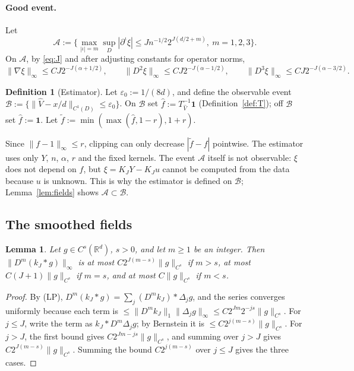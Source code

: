 \documentclass[11pt]{article}
\newtheorem{lemma}[theorem]{Lemma}
\theoremstyle{definition}
\newtheorem{definition}[theorem]{Definition}
\theoremstyle{remark}
\newcommand{\R}{\mathbb R}
\newcommand{\one}{\mathbf 1}
\newcommand{\cA}{\mathcal A}
\newcommand{\cB}{\mathcal B}
\begin{document}
\paragraph{Good event.} Let
\[
\cA:=\Big\{\max_{|\iota|=m}\sup_D|\partial^\iota\xi|\le Jn^{-1/2}2^{J(d/2+m)},\ m=1,2,3\Big\}.
\]
On $\cA$, by \eqref{eq:J} and after adjusting constants for operator norms,
\begin{equation}\label{eq:xi}
\|\nabla\xi\|_\infty\le CJ2^{-J(\alpha+1/2)},\qquad\|D^2\xi\|_\infty\le CJ2^{-J(\alpha-1/2)},\qquad\|D^3\xi\|_\infty\le CJ2^{-J(\alpha-3/2)} .
\end{equation}

\begin{definition}[Estimator]\label{def:est}
Let $\varepsilon_0:=1/(8d)$, and define the observable event $\cB:=\{\|\hat V-x/d\|_{C^1(D)}\le\varepsilon_0\}$. On $\cB$ set $\hat f:=T^{-1}_{\hat V}\one$ (Definition~\ref{def:T}); off $\cB$ set $\hat f:=\one$. Let $\tilde f:=\min(\max(\hat f,1-r),1+r)$.
\end{definition}

Since $\|f-1\|_\infty\le r$, clipping can only decrease $|\tilde f-f|$ pointwise. The estimator uses only $Y$, $n$, $\alpha$, $r$ and the fixed kernels. The event $\cA$ itself is not observable: $\xi$ does not depend on $f$, but $\xi=K_JY-K_Ju$ cannot be computed from the data because $u$ is unknown. This is why the estimator is defined on $\cB$; Lemma~\ref{lem:fields} shows $\cA\subset\cB$.

\subsection{The smoothed fields}

\begin{lemma}\label{lem:LP}
Let $g\in C^s(\R^d)$, $s>0$, and let $m\ge1$ be an integer. Then $\|D^m(k_J*g)\|_\infty$ is at most $C2^{J(m-s)}\|g\|_{C^s}$ if $m>s$, at most $C(J+1)\|g\|_{C^s}$ if $m=s$, and at most $C\|g\|_{C^s}$ if $m<s$.
\end{lemma}

\begin{proof}
By (LP), $D^m(k_J*g)=\sum_j(D^mk_J)*\Delta_jg$, and the series converges uniformly because each term is $\le\|D^mk_J\|_1\|\Delta_jg\|_\infty\le C2^{Jm}2^{-js}\|g\|_{C^s}$. For $j\le J$, write the term as $k_J*D^m\Delta_jg$; by Bernstein it is $\le C2^{j(m-s)}\|g\|_{C^s}$. For $j>J$, the first bound gives $C2^{Jm-js}\|g\|_{C^s}$, and summing over $j>J$ gives $C2^{J(m-s)}\|g\|_{C^s}$. Summing the bound $C2^{j(m-s)}$ over $j\le J$ gives the three cases.
\end{proof}
\end{document}
